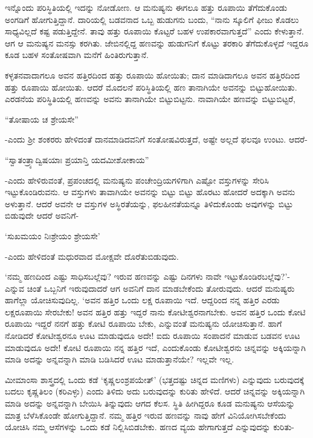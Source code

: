 ಇನ್ನೊಂದು ಪರಿಸ್ಥಿತಿಯಲ್ಲಿ ಇದನ್ನು ನೋಡೋಣ. ಆ ಮನುಷ್ಯನು ಈಗಲೂ ಹತ್ತು ರೂಪಾಯಿ ತೆಗೆದುಕೊಂಡು ಅಂಗಡಿಗೆ ಹೋಗುತ್ತಿದ್ದಾನೆ. ದಾರಿಯಲ್ಲಿ ಬಡವನಾದ ಒಬ್ಬ ಹುಡುಗನು ಬಂದು, ``ನಾನು ಸ್ಕೂಲಿಗೆ ಫೀಜು ಕೊಡಲು ಸಾಧ್ಯವಿಲ್ಲದೆ ಕಷ್ಟ ಪಡುತ್ತಿದ್ದೇನೆ. ತಾವು ಹತ್ತು ರೂಪಾಯಿ ಕೊಟ್ಟರೆ ಬಹಳ ಉಪಕಾರವಾಗುತ್ತದೆ'' ಎಂದು ಕೇಳುತ್ತಾನೆ. ಆಗ ಆ ಮನುಷ್ಯನ ಮನಸ್ಸು ಕರಗಿತು. ಜೇಬಿನಲ್ಲಿದ್ದ ಹಣವನ್ನು ಹುಡುಗನಿಗೆ ಕೊಟ್ಟು ತರಕಾರಿ ತೆಗೆದುಕೊಳ್ಳದೆ ಇದ್ದರೂ ಕೂಡ ಬಹಳ ಸಂತೋಷವಾಗಿ ಮನೆಗೆ ಹಿಂತಿರುಗುತ್ತಾನೆ.

ಕಳ್ಳತನವಾದಾಗಲೂ ಅವನ ಹತ್ತಿರದಿಂದ ಹತ್ತು ರೂಪಾಯಿ ಹೋಯಿತು; ದಾನ ಮಾಡಿದಾಗಲೂ ಅವನ ಹತ್ತಿರದಿಂದ ಹತ್ತು ರೂಪಾಯಿ ಹೋಯಿತು. ಆದರೆ ಮೊದಲನೆ ಪರಿಸ್ಥಿತಿಯಲ್ಲಿ ಹಣ ತಾನಾಗಿಯೇ ಅವನನ್ನು ಬಿಟ್ಟುಹೋಯಿತು. ಎರಡನೆಯ ಪರಿಸ್ಥಿತಿಯಲ್ಲಿ ಹಣವನ್ನು ಅವನು ತಾನಾಗಿಯೇ ಬಿಟ್ಟುಬಿಟ್ಟನು. ನಾವಾಗಿಯೇ ಹಣವನ್ನು ಬಿಟ್ಟುಬಿಟ್ಟರೆ,

\begin{shloka}
``ತೋಷಾಯ ಚ ಶ್ರೇಯಸೇ''
\end{shloka}

-ಎಂದು ಶ್ರೀ ಶಂಕರರು ಹೇಳಿದಂತೆ ದಾನಮಾಡಿದವನಿಗೆ ಸಂತೋಷವಿರುತ್ತದೆ, ಅಷ್ಟೇ ಅಲ್ಲದೆ ಫಲವೂ ಉಂಟು. ಆದರೆ-

\begin{shloka}
``ಸ್ವಾತಂತ್ರ್ಯಾದ್ವಿಷಯಾಃ ಪ್ರಯಾನ್ತಿ ಯದಮೀಶೋಕಾಯ''
\end{shloka}

-ಎಂದು ಹೇಳಿರುವಂತೆ, ಪ್ರಪಂಚದಲ್ಲಿ ಮನುಷ್ಯನು ಪಂಚೇಂದ್ರಿಯಗಳಿಗಾಗಿ ಎಷ್ಟೋ ವಸ್ತುಗಳನ್ನು ಸೇರಿಸಿ ಇಟ್ಟುಕೊಂಡಿರುವನು. ಆ ವಸ್ತುಗಳು ತಾವಾಗಿಯೇ ಅವನನ್ನು ಬಿಟ್ಟು ಬಿಟ್ಟು ಹೊರಟು ಹೋದರೆ ಅದಕ್ಕಾಗಿ ಅವನು ಅಳುತ್ತಾನೆ. ಆದರೆ ಅವನೇ ಆ ವಸ್ತುಗಳ ಅಸ್ಥಿರತೆಯನ್ನು, ಫಲಹೀನತೆಯನ್ನೂ ತಿಳಿದುಕೊಂಡು ಅವುಗಳನ್ನು ಬಿಟ್ಟು ಬಿಡುವುದೇ ಆದರೆ ಅವನಿಗೆ-

\begin{shloka}
`ಸುಖಮಯಂ ನಿಃಶ್ರೇಯಂ ಶ್ರೇಯಸೇ'
\end{shloka}

-ಎಂದು ಹೇಳಿದಂತೆ ಮಧುರವಾದ ಮೋಕ್ಷವೇ ದೊರೆತುಬಿಡುವುದು.

`ನಮ್ಮ ಹಣದಿಂದ ಎಷ್ಟು ಸಾಧಿಸಬಲ್ಲೆವು? ಇರುವ ಹಣವನ್ನು ಎಷ್ಟು ದಿನಗಳು ನಾವೇ ಇಟ್ಟುಕೊಂಡಿರಬಲ್ಲೆವು?'-ಎನ್ನುವ ಚಿಂತೆ ಒಬ್ಬನಿಗೆ ಇರುವುದಾದರೆ ಆಗ ಅವನಿಗೆ ದಾನ ಮಾಡಬೇಕೆಂದು ತೋರುವುದು. ಆದರೆ ಮನುಷ್ಯರು ಹಾಗೆಲ್ಲಾ ಯೋಚಿಸುವುದಿಲ್ಲ. `ಅವನ ಹತ್ತಿರ ಒಂದು ಲಕ್ಷ ರೂಪಾಯಿ ಇದೆ. ಆದ್ದರಿಂದ ನನ್ನ ಹತ್ತಿರ ಎರಡು ಲಕ್ಷರೂಪಾಯಿ ಸೇರಬೇಕು! ಅವನ ಹತ್ತಿರ ಹತ್ತು ಇದ್ದರೆ ನಾನು ಕೋಟೀಶ್ವರನಾಗಬೇಕು. ಅವನ ಹತ್ತಿರ ಒಂದು ಕೋಟಿ ರೂಪಾಯಿ ಇದ್ದರೆ ನನಗೆ ಹತ್ತು ಕೋಟಿ ರೂಪಾಯಿ ಬೇಕು, ಎನ್ನುವಂತೆ ಮನುಷ್ಯನು ಯೋಚಿಸುತ್ತಾನೆ. ಹಾಗೆ ನೋಡಿದರೆ ಕೋಟೀಶ್ವರನೂ ಊಟ ಮಾಡುವುದೂ ಅದೇ! ಐದು ರೂಪಾಯಿ ಸಂಪಾದನೆ ಮಾಡುವ ಬಡವನ ಊಟ ಮಾಡುವುದೂ ಅದೇ! ಕೋಟಿ ರೂಪಾಯಿ ನನ್ನ ಹತ್ತಿರ ಇದೆ, ಎಂದುಕೊಂಡು ಕೋಟೀಶ್ವರನು ಚಿನ್ನವನ್ನು ಅಕ್ಕಿಯನ್ನಾಗಿ ಮಾಡಿ ಅದನ್ನು ಅನ್ನವನ್ನಾಗಿ ಮಾಡಿ ಬಡಿಸಿದರೆ ಊಟ ಮಾಡುತ್ತಾನೆಯೇ? ಇಲ್ಲವೇ ಇಲ್ಲ.

ಮೀಮಾಂಸಾ ಶಾಸ್ತ್ರದಲ್ಲಿ ಒಂದು ಕಡೆ `ಕೃಷ್ಣಲಂಶ್ರಪಯೇತ್' (ಭತ್ತದಷ್ಟು ಚಿನ್ನದ ಮಣಿಗಳು) ಎನ್ನುವುದು ಬರುವುದಕ್ಕೆ ಬದಲು ಕೃಷ್ಣತಿಲಂ (ಕರಿಎಳ್ಳು) ಎಂದು ತಿಳಿದು ಅದು ಬರುವುದನ್ನು ಕುರಿತು ಹೇಳಿದೆ. ಆದರೆ ಚಿನ್ನವನ್ನು ಅಕ್ಕಿಯನ್ನಾಗಿ ಮಾಡಿ ಅದನ್ನು ಅನ್ನವನ್ನಾಗಿ ಬೇಯಿಸಿ ತಿನ್ನುವುದು ಆಗದ ಕೆಲಸ. ಸ್ಥಿತಿ ಹೀಗಿದ್ದರೂ ಕೂಡ ಮನುಷ್ಯನು ಆಸೆಯನ್ನು ಮಾತ್ರ ಬೆಳೆಸಿಕೊಂಡೇ ಹೋಗುತ್ತಿದ್ದಾನೆ. ನಮ್ಮ ಹತ್ತಿರ ಇರುವ ಹಣವನ್ನು ನಾವು ಹೇಗೆ ವಿನಿಯೋಗಿಸಬೇಕೆಂದು ಯೋಚಿಸಿ ನಮ್ಮ ಆಸೆಗಳನ್ನು ಒಂದು ಕಡೆ ನಿಲ್ಲಿಸಿಬಿಡಬೇಕು. ಹಣದ ವ್ಯಯ ಹೇಗಾಗುತ್ತದೆ ಎನ್ನುವುದನ್ನು ಕುರಿತು-

